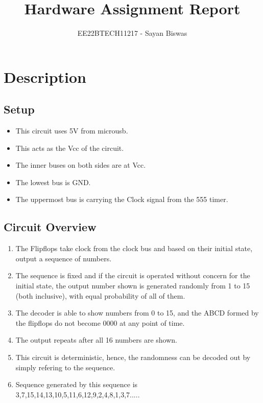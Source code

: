 \documentclass{article}
\begin{document}
\title{Hardware Assignment Report}
\author{EE22BTECH11217 -  Sayan Biswas}
\date{}
\maketitle

\maketitle

\section{Description}

\subsection{Setup}
\begin{itemize}
\item This circuit uses 5V from microusb.
\item This acts as the Vcc of the circuit. 
\item The inner buses on both sides are at Vcc. 
\item The lowest bus is GND. 
\item The uppermost bus is carrying the Clock signal from the 555 timer.
\end{itemize}

\subsection{Circuit Overview}
\begin{enumerate}
\item The Flipflops take clock from the clock bus and based on their initial state, output a sequence of numbers.
\item The sequence is fixed and if the circuit is operated without concern for the initial state, the output number shown is generated randomly from 1 to 15 (both inclusive), with equal probability of all of them.
\item The decoder is able to show numbers from 0 to 15, and the ABCD formed by the flipflops do not become 0000 at any point of time.
\item The output repeats after all 16 numbers are shown.
\item This circuit is deterministic, hence, the randomness can be decoded out by simply refering to the sequence. 
\item Sequence generated by this sequence is 3,7,15,14,13,10,5,11,6,12,9,2,4,8,1,3,7.....
\end{enumerate}
\end{document}
